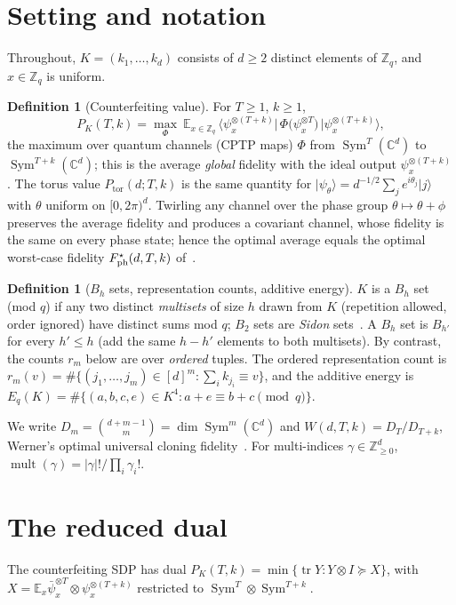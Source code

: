 \documentclass[11pt]{article}
\newcommand{\Z}{\mathbb{Z}}
\newcommand{\C}{\mathbb{C}}
\newcommand{\E}{\mathbb{E}}
\newcommand{\tr}{\operatorname{tr}}
\newcommand{\mult}{\operatorname{mult}}
\newcommand{\Sym}{\operatorname{Sym}}
\newcommand{\Ptor}{P_{\mathrm{tor}}}
\newcommand{\ket}[1]{\lvert #1\rangle}
\newcommand{\bra}[1]{\langle #1\rvert}
\theoremstyle{definition}
\newtheorem{definition}[theorem]{Definition}
\theoremstyle{remark}
\begin{document}
\section{Setting and notation}\label{sec:setting}
Throughout, $K=(k_1,\dots,k_d)$ consists of $d\ge2$ distinct elements of $\Z_q$, and $x\in\Z_q$ is uniform.

\begin{definition}[Counterfeiting value]
For $T\ge1$, $k\ge1$,
\[
P_K(T,k)=\max_{\Phi}\ \E_{x\in\Z_q}\,\bra{\psi_x^{\otimes(T+k)}}\,\Phi\big(\psi_x^{\otimes T}\big)\,\ket{\psi_x^{\otimes(T+k)}},
\]
the maximum over quantum channels (CPTP maps) $\Phi$ from $\Sym^T(\C^d)$ to $\Sym^{T+k}(\C^d)$; this is the
average \emph{global} fidelity with the ideal output $\psi_x^{\otimes(T+k)}$. The torus value $\Ptor(d;T,k)$ is the same
quantity for $\ket{\psi_\theta}=d^{-1/2}\sum_je^{i\theta_j}\ket j$ with $\theta$ uniform on $[0,2\pi)^d$. Twirling any channel over
the phase group $\theta\mapsto\theta+\phi$ preserves the average fidelity and produces a covariant channel, whose fidelity is the
same on every phase state; hence the optimal average equals the optimal worst-case fidelity $F^\star_{\rm ph}(d,T,k)$
of~\cite[Thm.~II.3; formal statement Thm.~X.1, Eq.~(16)]{Herasymenko2026}.
\end{definition}

\begin{definition}[$B_h$ sets, representation counts, additive energy]
$K$ is a $B_h$ set (mod $q$) if any two distinct \emph{multisets} of size $h$ drawn from $K$ (repetition allowed, order
ignored) have distinct sums mod $q$; $B_2$ sets are \emph{Sidon} sets~\cite{ErdosTuran1941,OBryant2004}. A $B_h$ set is $B_{h'}$
for every $h'\le h$ (add the same $h-h'$ elements to both multisets). By contrast, the counts $r_m$ below are over \emph{ordered}
tuples. The ordered representation count is
$r_m(v)=\#\{(j_1,\dots,j_m)\in[d]^m:\sum_i k_{j_i}\equiv v\}$, and the additive energy is
$E_q(K)=\#\{(a,b,c,e)\in K^4:a+e\equiv b+c \pmod q\}$.
\end{definition}

We write $D_m=\binom{d+m-1}{m}=\dim\Sym^m(\C^d)$ and $W(d,T,k)=D_T/D_{T+k}$, Werner's optimal universal cloning
fidelity~\cite{Werner1998}. For multi-indices $\gamma\in\Z_{\ge0}^d$, $\mult(\gamma)=|\gamma|!/\prod_i\gamma_i!$.

\section{The reduced dual}\label{sec:dual}
The counterfeiting SDP has dual $P_K(T,k)=\min\{\tr Y : Y\otimes I\succeq X\}$, with
$X=\E_x \bar\psi_x^{\otimes T}\otimes\psi_x^{\otimes (T+k)}$ restricted to $\Sym^T\otimes\Sym^{T+k}$.
\end{document}
